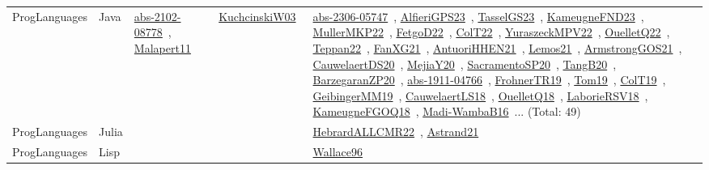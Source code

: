 {\begin{longtable}{lp{3cm}>{\raggedright\arraybackslash}p{6cm}>{\raggedright\arraybackslash}p{6cm}>{\raggedright\arraybackslash}p{8cm}}
ProgLanguages & Java & \href{works/abs-2102-08778.pdf}{abs-2102-08778}~\cite{abs-2102-08778}, \href{works/Malapert11.pdf}{Malapert11}~\cite{Malapert11} & \href{works/KuchcinskiW03.pdf}{KuchcinskiW03}~\cite{KuchcinskiW03} & \href{works/abs-2306-05747.pdf}{abs-2306-05747}~\cite{abs-2306-05747}, \href{works/AlfieriGPS23.pdf}{AlfieriGPS23}~\cite{AlfieriGPS23}, \href{works/TasselGS23.pdf}{TasselGS23}~\cite{TasselGS23}, \href{works/KameugneFND23.pdf}{KameugneFND23}~\cite{KameugneFND23}, \href{works/MullerMKP22.pdf}{MullerMKP22}~\cite{MullerMKP22}, \href{works/FetgoD22.pdf}{FetgoD22}~\cite{FetgoD22}, \href{works/ColT22.pdf}{ColT22}~\cite{ColT22}, \href{works/YuraszeckMPV22.pdf}{YuraszeckMPV22}~\cite{YuraszeckMPV22}, \href{works/OuelletQ22.pdf}{OuelletQ22}~\cite{OuelletQ22}, \href{works/Teppan22.pdf}{Teppan22}~\cite{Teppan22}, \href{works/FanXG21.pdf}{FanXG21}~\cite{FanXG21}, \href{works/AntuoriHHEN21.pdf}{AntuoriHHEN21}~\cite{AntuoriHHEN21}, \href{works/Lemos21.pdf}{Lemos21}~\cite{Lemos21}, \href{works/ArmstrongGOS21.pdf}{ArmstrongGOS21}~\cite{ArmstrongGOS21}, \href{works/CauwelaertDS20.pdf}{CauwelaertDS20}~\cite{CauwelaertDS20}, \href{works/MejiaY20.pdf}{MejiaY20}~\cite{MejiaY20}, \href{works/SacramentoSP20.pdf}{SacramentoSP20}~\cite{SacramentoSP20}, \href{works/TangB20.pdf}{TangB20}~\cite{TangB20}, \href{works/BarzegaranZP20.pdf}{BarzegaranZP20}~\cite{BarzegaranZP20}, \href{works/abs-1911-04766.pdf}{abs-1911-04766}~\cite{abs-1911-04766}, \href{works/FrohnerTR19.pdf}{FrohnerTR19}~\cite{FrohnerTR19}, \href{works/Tom19.pdf}{Tom19}~\cite{Tom19}, \href{works/ColT19.pdf}{ColT19}~\cite{ColT19}, \href{works/GeibingerMM19.pdf}{GeibingerMM19}~\cite{GeibingerMM19}, \href{works/CauwelaertLS18.pdf}{CauwelaertLS18}~\cite{CauwelaertLS18}, \href{works/OuelletQ18.pdf}{OuelletQ18}~\cite{OuelletQ18}, \href{works/LaborieRSV18.pdf}{LaborieRSV18}~\cite{LaborieRSV18}, \href{works/KameugneFGOQ18.pdf}{KameugneFGOQ18}~\cite{KameugneFGOQ18}, \href{works/Madi-WambaB16.pdf}{Madi-WambaB16}~\cite{Madi-WambaB16}... (Total: 49)\\
ProgLanguages & Julia &  &  & \href{works/HebrardALLCMR22.pdf}{HebrardALLCMR22}~\cite{HebrardALLCMR22}, \href{works/Astrand21.pdf}{Astrand21}~\cite{Astrand21}\\
ProgLanguages & Lisp &  &  & \href{works/Wallace96.pdf}{Wallace96}~\cite{Wallace96}\\

\end{longtable}}
